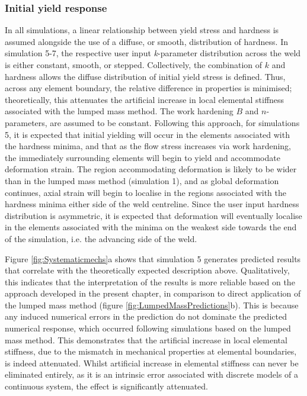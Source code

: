 \subsubsection{Initial yield response}
\label{SMDModellingstudyDiscussionPropertydistributionsYS}
In all simulations, a linear relationship between yield stress and hardness is assumed alongside the use of a diffuse, or smooth, distribution of hardness. In simulation 5-7, the respective user input \textit{k}-parameter distribution across the weld is either constant, smooth, or stepped. Collectively, the combination of $k$ and hardness allows the diffuse distribution of initial yield stress is defined. Thus, across any element boundary, the relative difference in properties is minimised; theoretically, this attenuates the artificial increase in local elemental stiffness associated with the lumped mass method. The work hardening $B$ and $n$-parameters, are assumed to be constant. Following this approach, for simulations 5, it is expected that initial yielding will occur in the elements associated with the hardness minima, and that as the flow stress increases via work hardening, the immediately surrounding elements will begin to yield and accommodate deformation strain. The region accommodating deformation is likely to be wider than in the lumped mass method (simulation 1), and as global deformation continues, axial strain will begin to localise in the regions associated with the hardness minima either side of the weld centreline. Since the user input hardness distribution is asymmetric, it is expected that deformation will eventually localise in the elements associated with the minima on the weakest side towards the end of the simulation, i.e. the advancing side of the weld. 

Figure \ref{fig:Systematicmechs}a shows that simulation 5 generates predicted results that correlate with the theoretically expected description above. Qualitatively, this indicates that the interpretation of the results is more reliable based on the approach developed in the present chapter, in comparison to direct application of the lumped mass method (figure \ref{fig:LumpedMassPredictions}b). This is because any induced numerical errors in the prediction do not dominate the predicted numerical response, which occurred following simulations based on the lumped mass method. This demonstrates that the artificial increase in local elemental stiffness, due to the mismatch in mechanical properties at elemental boundaries, is indeed attenuated. Whilst artificial increase in elemental stiffness can never be eliminated entirely, as it is an intrinsic error associated with discrete models of a continuous system, the effect is significantly attenuated. 


